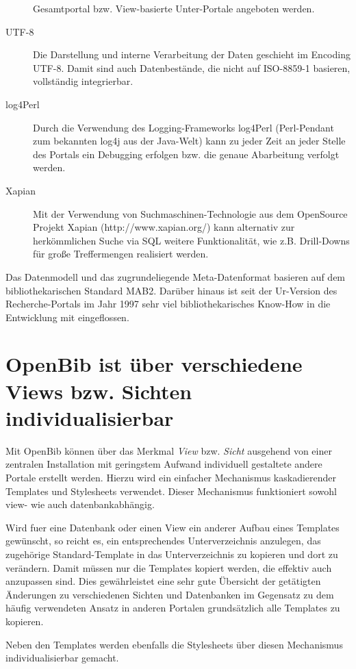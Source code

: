 \documentclass[11pt, twoside, a4paper, BCOR8mm, DIV12, bibtotoc,idxtotoc]{scrbook}
\begin{document}
\begin{description}
  Gesamtportal bzw. View-basierte Unter-Portale angeboten werden.
\item[UTF-8] Die Darstellung und interne Verarbeitung der Daten
  geschieht im Encoding UTF-8. Damit sind auch Datenbestände, die
  nicht auf ISO-8859-1 basieren, vollständig integrierbar.
\item[log4Perl] Durch die Verwendung des Logging-Frameworks log4Perl
  (Perl-Pendant zum bekannten log4j aus der Java-Welt) kann zu
  jeder Zeit an jeder Stelle des Portals ein Debugging erfolgen
  bzw. die genaue Abarbeitung verfolgt werden.
\item[Xapian] Mit der Verwendung von Suchmaschinen-Technologie aus dem
  OpenSource Projekt Xapian (http://www.xapian.org/) kann alternativ
  zur herkömmlichen Suche via SQL weitere Funk\-tio\-na\-li\-tät, wie
  z.B. Drill-Downs für große Treffermengen realisiert werden.
\end{description}

Das Datenmodell und das zugrundeliegende Meta-Datenformat basieren auf
dem biblio\-the\-ka\-ri\-schen Standard MAB2. Darüber hinaus ist seit der
Ur-Version des Recherche-Portals im Jahr 1997 sehr viel
bibliothekarisches Know-How in die Entwicklung mit eingeflossen.


\section{OpenBib ist über verschiedene Views bzw. Sichten
  individualisierbar}
Mit OpenBib können über das Merkmal \textit{View}
bzw. \textit{Sicht} ausgehend von einer zentralen In\-stal\-la\-tion mit
geringstem Aufwand individuell gestaltete andere Portale erstellt
werden. Hierzu wird ein einfacher Mechanismus kaskadierender Templates
und Stylesheets verwendet. Dieser Mechanismus funktioniert sowohl
view- wie auch datenbankabhängig. 

Wird fuer eine Datenbank oder einen View ein anderer Aufbau eines
Templates gewünscht, so reicht es, ein entsprechendes
Unterverzeichnis anzulegen, das zugehörige Standard-Template in das
Unterverzeichnis zu kopieren und dort zu verändern. Damit müssen nur
die Templates kopiert werden, die effektiv auch anzupassen sind. Dies
gewährleistet eine sehr gute Übersicht der getätigten Änderungen
zu verschiedenen Sichten und Datenbanken im Gegensatz zu dem häufig
verwendeten Ansatz in anderen Portalen grundsätzlich alle Templates
zu kopieren.

Neben den Templates werden ebenfalls die Stylesheets über diesen
Mechanismus individualisierbar gemacht.
\end{document}
